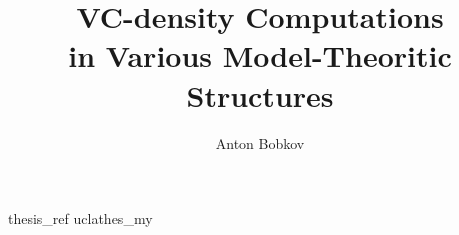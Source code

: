 \documentclass [PhD] {uclathes}
\title          {VC-density Computations \\
                in Various Model-Theoritic Structures}
\author         {Anton Bobkov}
\begin{document}
\makeintropages




 


 {thesis_ref}    %
 {uclathes_my}
\end{document}
